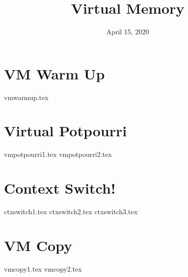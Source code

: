 \documentclass[11pt]{exam}
\title{Virtual Memory}
\date{April 15, 2020}
\begin{document}
\maketitle

\section{VM Warm Up}
\begin{questions}
{vmwarmup.tex}
\end{questions}
\newpage

\section{Virtual Potpourri}
\begin{questions}
{vmpotpourri1.tex}
{vmpotpourri2.tex}
\end{questions}
\newpage

\section{Context Switch!}
\begin{questions}
{ctxswitch1.tex}
{ctxswitch2.tex}
{ctxswitch3.tex}
\end{questions}
\newpage

\section{VM Copy}
\begin{questions}
{vmcopy1.tex}
{vmcopy2.tex}
\end{questions}
\end{document}
